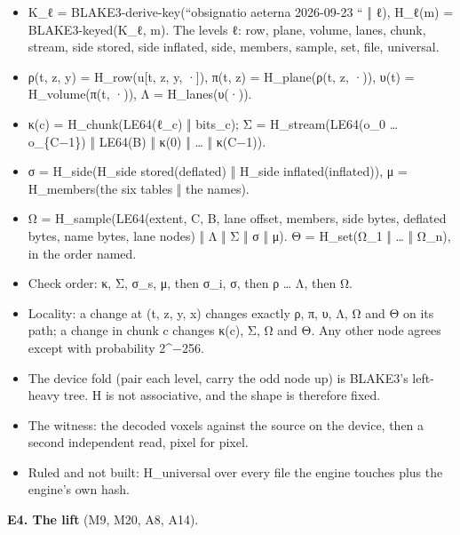 \begin{itemize}
\item K\_\allowbreak{}ℓ = BLAKE3-derive-key(“obsignatio aeterna 2026-09-23 “ ‖ ℓ), H\_\allowbreak{}ℓ(m) = BLAKE3-keyed(K\_\allowbreak{}ℓ, m). The levels ℓ: row, plane, volume, lanes, chunk, stream, side stored, side inflated, side, members, sample, set, file, universal.
\item ρ(t, z, y) = H\_\allowbreak{}row(u[t, z, y, ·]), π(t, z) = H\_\allowbreak{}plane(ρ(t, z, ·)), υ(t) = H\_\allowbreak{}volume(π(t, ·)), Λ = H\_\allowbreak{}lanes(υ(·)).
\item κ(c) = H\_\allowbreak{}chunk(LE64(ℓ\_\allowbreak{}c) ‖ bits\_\allowbreak{}c); Σ = H\_\allowbreak{}stream(LE64(o\_\allowbreak{}0 … o\_\allowbreak{}\{C−1\}) ‖ LE64(B) ‖ κ(0) ‖ … ‖ κ(C−1)).
\item σ = H\_\allowbreak{}side(H\_\allowbreak{}side stored(deflated) ‖ H\_\allowbreak{}side inflated(inflated)), μ = H\_\allowbreak{}members(the six tables ‖ the names).
\item Ω = H\_\allowbreak{}sample(LE64(extent, C, B, lane offset, members, side bytes, deflated bytes, name bytes, lane nodes) ‖ Λ ‖ Σ ‖ σ ‖ μ). Θ = H\_\allowbreak{}set(Ω\_\allowbreak{}1 ‖ … ‖ Ω\_\allowbreak{}n), in the order named.
\item Check order: κ, Σ, σ\_\allowbreak{}s, μ, then σ\_\allowbreak{}i, σ, then ρ … Λ, then Ω.
\item Locality: a change at (t, z, y, x) changes exactly ρ, π, υ, Λ, Ω and Θ on its path; a change in chunk c changes κ(c), Σ, Ω and Θ. Any other node agrees except with probability 2\textasciicircum{}−256.
\item The device fold (pair each level, carry the odd node up) is BLAKE3's left-heavy tree. H is not associative, and the shape is therefore fixed.
\item The witness: the decoded voxels against the source on the device, then a second independent read, pixel for pixel.
\item Ruled and not built: H\_\allowbreak{}universal over every file the engine touches plus the engine's own hash.
\end{itemize}

\textbf{E4. The lift} (M9, M20, A8, A14).

